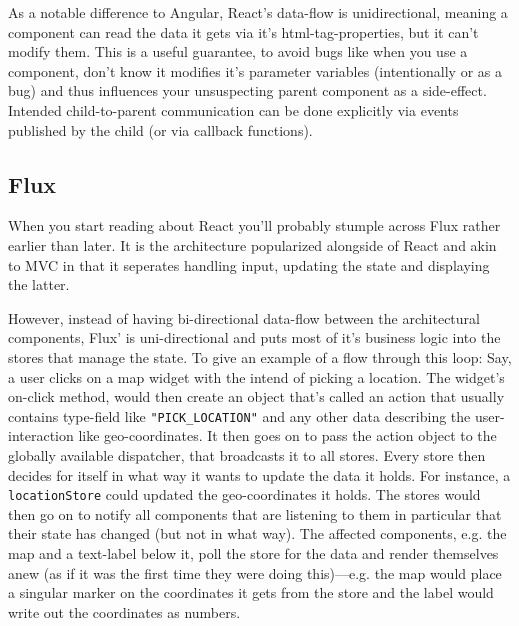 As a notable difference to Angular, React's data-flow is unidirectional, meaning a component can read the data it gets via it's html-tag-properties, but it can't modify them. This is a useful guarantee, to avoid bugs like when you use a component, don't know it modifies it's parameter variables (intentionally or as a bug) and thus influences your unsuspecting parent component as a side-effect. Intended child-to-parent communication can be done explicitly via events published by the child (or via callback functions). 

\subsection{Flux}\label{ref:flux}

When you start reading about React you'll probably stumple across Flux rather earlier than later. It is the architecture popularized alongside of React and akin to MVC in that it seperates handling input, updating the state and displaying the latter.

However, instead of having bi-directional data-flow between the architectural components, Flux' is uni-directional and puts most of it's business logic into the stores that manage the state. To give an example of a flow through this loop: Say, a user clicks on a map widget with the intend of picking a location. The widget's on-click method, would then create an object that's called an action that usually contains type-field like \texttt{"PICK\_LOCATION"} and any other data describing the
user-interaction like geo-coordinates. It then goes on to pass the action object to the globally available dispatcher, that broadcasts it to all stores. Every store then decides for itself in what way it wants to update the data it holds. For instance, a \texttt{locationStore} could updated the geo-coordinates it holds. The stores would then go on to notify all components that are listening to them in particular that their state has changed (but not in what way). The affected
components, e.g. the map and a text-label below it, poll the store for the data and render themselves anew (as if it was the first time they were doing this)---e.g. the map would place a singular marker on the coordinates it gets from the store and the label would write out the coordinates as numbers.

